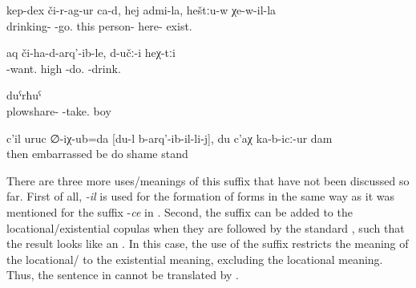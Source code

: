 \begin{exe}

	\ex	\label{ex:‎‎the drunkenness passed, of this person who is here (on this picture)}
	\gll	kep-dex či-r-ag-ur ca-d, hej admi-la, heštːu-w χe-w-il-la\\
		drinking-	-go.		this	person-	here-	exist. \\
	\glt	{}
	
	\ex	\label{ex:The one who wanted (milk) lifted (the cans) up and}
	\gll	[b-ikː-an-il-li]	aq	či-ha-d-arq'-ib-le,	d-učː-i	heχ-tːi\\
		-want.	high	-do.	-drink.	 \\
	\glt	{}

	\ex	\label{ex:the son of (the one) who took away our ploughshare}
		duˁrħuˁ\\
			plowshare-	-take.	boy\\
	\glt	{}
	
		\ex	\label{ex:‎Then I was embarrassed for what I had done; I felt ashamed}
	\gll	c'il	uruc	∅-iχ-ub=da	[du-l	b-arq'-ib-il-li-j],	du	c'aχ	ka-b-icː-ur	dam\\
		then	embarrassed	be		do		shame	stand	\\
	\glt	{}
\end{exe}	

There are three more uses\slash meanings of this suffix that have not been discussed so far. First of all, \textit{-il} is used for the formation of  forms in the same way as it was mentioned for the suffix -\textit{ce} in . Second, the suffix  can be added to the locational/existential copulas when they are followed by the standard , such that the result looks like an . In this case, the use of the suffix restricts the meaning of the locational/ to the existential meaning, excluding the locational meaning. Thus, the sentence in  cannot be translated by .

